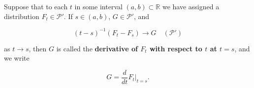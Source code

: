 Suppose that to each $t$ in some interval $(a, b) \subset \mathbb{R}$ we have assigned a distribution $F_t \in \mathcal{P}'$. If $s \in (a, b)$, $G \in \mathcal{P}'$, and

$$(t - s)^{-1}(F_t - F_s) \rightarrow G \quad (\mathcal{P}')$$

as $t \rightarrow s$, then $G$ is called the \textbf{derivative of $F_t$ with respect to $t$ at $t = s$}, and we write

$$G = \frac{d}{dt} F_t \bigg|_{t=s}.$$
